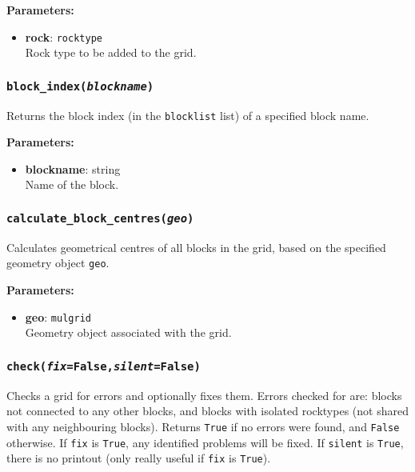 \textbf{Parameters:}
\begin{itemize}
\item \textbf{rock}: \texttt{rocktype}\\
  Rock type to be added to the grid.
\end{itemize}

\begin{snugshade}
\subsubsection{\texttt{block\_index(\emph{blockname})}}
\end{snugshade}
\label{sec:t2grid:block_index}

Returns the block index (in the \texttt{blocklist} list) of a specified block name.

\textbf{Parameters:}
\begin{itemize}
\item \textbf{blockname}: string\\
  Name of the block.
\end{itemize}

\begin{snugshade}
\subsubsection{\texttt{calculate\_block\_centres(\emph{geo})}}
\end{snugshade}
\label{sec:t2grid:calculate_block_centres}

Calculates geometrical centres of all blocks in the grid, based on the specified geometry object \texttt{geo}.

\textbf{Parameters:}
\begin{itemize}
\item \textbf{geo}: \texttt{mulgrid}\\
  Geometry object associated with the grid.
\end{itemize}

\begin{snugshade}
\subsubsection{\texttt{check(\emph{fix}=False,\emph{silent}=False)}}
\end{snugshade}
\label{sec:t2grid:check}

Checks a grid for errors and optionally fixes them.  Errors checked for are: blocks not connected to any other blocks, and blocks with isolated rocktypes (not shared with any neighbouring blocks).  Returns \texttt{True} if no errors were found, and \texttt{False} otherwise.  If \texttt{fix} is \texttt{True}, any identified problems will be fixed.  If \texttt{silent} is \texttt{True}, there is no printout (only really useful if \texttt{fix} is \texttt{True}).


